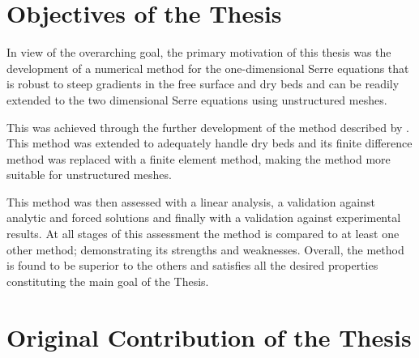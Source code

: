 \section{Objectives of the Thesis}
%
%


In view of the overarching goal, the primary motivation of this thesis was the development of a numerical method for the one-dimensional Serre equations that is robust to steep gradients in the free surface and dry beds and can be readily extended to the two dimensional Serre equations using unstructured meshes. 

This was achieved through the further development of the method described by \citet{Zoppou-2014}. This method was extended to adequately handle dry beds and its finite difference method was replaced with a finite element method, making the method more suitable for unstructured meshes. 

This method was then assessed with a linear analysis, a validation against analytic and forced solutions and finally with a validation against experimental results. At all stages of this assessment the method is compared to at least one other method; demonstrating its strengths and weaknesses. Overall, the method is found to be superior to the others and satisfies all the desired properties constituting the main goal of the Thesis.  

\section{Original Contribution of the Thesis}

